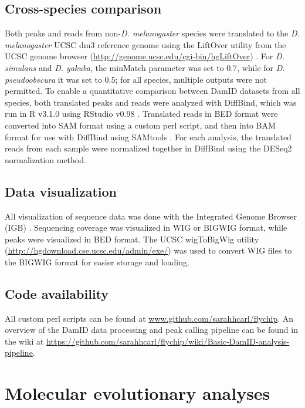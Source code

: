 \subsection{Cross-species comparison}
Both peaks and reads from non-\emph{D. melanogaster} species were translated to the \emph{D. melanogaster} UCSC dm3 reference genome using the LiftOver utility from the UCSC genome browser (\url{http://genome.ucsc.edu/cgi-bin/hgLiftOver}) \citep{bardet_computational_2011}. For \emph{D. simulans} and \emph{D. yakuba}, the minMatch parameter was set to 0.7, while for \emph{D. pseudoobscura} it was set to 0.5; for all species, multiple outputs were not permitted. To enable a quantitative comparison between DamID datasets from all species, both translated peaks and reads were analyzed with DiffBind, which was run in R v3.1.0 using RStudio v0.98 \citep{ross-innes_differential_2012}. Translated reads in BED format were converted into SAM format using a custom perl script, and then into BAM format for use with DiffBind using SAMtools \citep{li_sequence_2009}. For each analysis, the translated reads from each sample were normalized together in DiffBind using the DESeq2 normalization method. 

\subsection{Data visualization}
All visualization of sequence data was done with the Integrated Genome Browser (IGB) \citep{nicol_integrated_2009}. Sequencing coverage was visualized in WIG or BIGWIG format, while peaks were visualized in BED format. The UCSC wigToBigWig utility (\url{http://hgdownload.cse.ucsc.edu/admin/exe/}) was used to convert WIG files to the BIGWIG format for easier storage and loading.

\subsection{Code availability}
All custom perl scripts can be found at \url{www.github.com/sarahhcarl/flychip}. An overview of the DamID data processing and peak calling pipeline can be found in the wiki at \url{https://github.com/sarahhcarl/flychip/wiki/Basic-DamID-analysis-pipeline}.

\section{Molecular evolutionary analyses}
